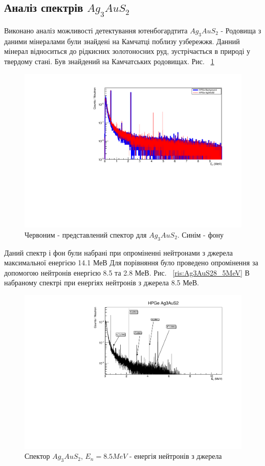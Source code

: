 \documentclass[a4paper, 14pt]{article}
\numberwithin{equation}{section}
\numberwithin{table}{section}
\begin{document}
\subsection{Аналіз спектрів $Ag_3AuS_2$}
Виконано аналіз можливості детектування ютенбогардтита $Ag_3AuS_2$ - Родовища з даними мінералами були знайдені на Камчатці поблизу узбережжя. Данний мінерал відноситься до рідкисних золотоносних руд, зустрічається в природі у твердому стані. Був знайдений на Камчатських родовищах. Рис. ~\ref{ris:Ag3AuS2Fon}		
\begin{figure}[hbt!]
	\centering \includegraphics[width=1\textwidth]{res/auFonAllLog.pdf}
	\caption{Червоним - представлений спектор для $Ag_3AuS_2$. Синім - фону} 
	\label{ris:Ag3AuS2Fon}	
\end{figure} 	
Даний спектр і фон були набрані при опроміненні нейтронами з джерела максимальної енергією 14.1 МеВ
Для порівняння було проведено опромінення за допомогою нейтронів енергією 8.5 та 2.8 МеВ. Рис. ~\ref{ris:Ag3AuS28_5MeV}	
В набраному спектрі при енергіях нейтронів з джерела 8.5 МеВ.
\begin{figure}[hbt!]
	\centering \includegraphics[width=1\textwidth]{res/Au_AnzSpectr.pdf}
	\caption{Спектор $Ag_3AuS_2$, $E_{n} = 8.5 MeV$ - енергія нейтронів з джерела}
	\label{ris:Ag3AuS28_5MeVPick}	
\end{figure} 
\end{document}
